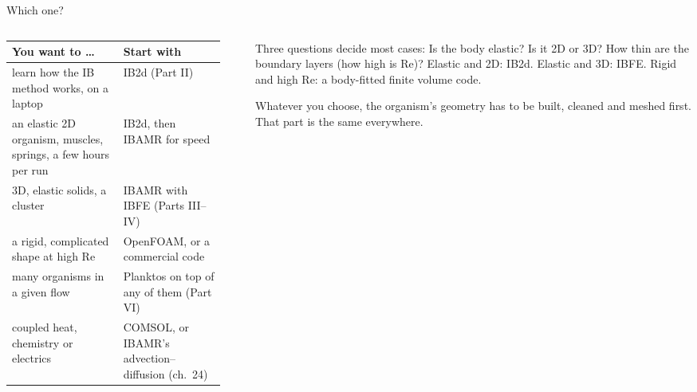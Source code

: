 \documentclass[aspectratio=169,11pt]{beamer}
\begin{document}
\begin{frame}{Which one?}
\begin{columns}[T,onlytextwidth]
\begin{column}{0.55\textwidth}
\scriptsize
\begin{tabular}{@{}L{0.48\linewidth}L{0.44\linewidth}@{}}
\toprule
You want to \ldots & Start with\\
\midrule
learn how the IB method works, on a laptop & IB2d (Part II)\\
an elastic 2D organism, muscles, springs, a few hours per run & IB2d, then IBAMR for speed\\
3D, elastic solids, a cluster & IBAMR with IBFE (Parts III--IV)\\
a rigid, complicated shape at high Re & OpenFOAM, or a commercial code\\
many organisms in a given flow & Planktos on top of any of them (Part VI)\\
coupled heat, chemistry or electrics & COMSOL, or IBAMR's advection--diffusion (ch.\ 24)\\
\bottomrule
\end{tabular}
\end{column}
\begin{column}{0.43\textwidth}
\begin{punchbox}
\small Three questions decide most cases: Is the body elastic? Is it 2D or 3D? How thin are the boundary layers (how high is Re)? Elastic and 2D: IB2d. Elastic and 3D: IBFE. Rigid and high Re: a body-fitted finite volume code.
\end{punchbox}
\vspace{2mm}
\small Whatever you choose, the organism's geometry has to be built, cleaned and meshed first. That part is the same everywhere.
\end{column}
\end{columns}
\end{frame}
\end{document}
